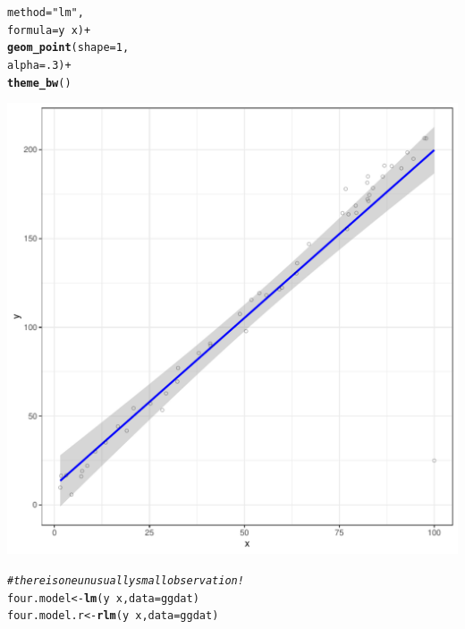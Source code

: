 \documentclass{article}\usepackage[]{graphicx}\usepackage[]{color}
\makeatletter
\def\maxwidth{ %
  \ifdim\Gin@nat@width>\linewidth
    \linewidth
  \else
    \Gin@nat@width
  \fi
}
\newcommand{\hlnum}[1]{\textcolor[rgb]{0.686,0.059,0.569}{#1}}%
\newcommand{\hlstr}[1]{\textcolor[rgb]{0.192,0.494,0.8}{#1}}%
\newcommand{\hlcom}[1]{\textcolor[rgb]{0.678,0.584,0.686}{\textit{#1}}}%
\newcommand{\hlopt}[1]{\textcolor[rgb]{0,0,0}{#1}}%
\newcommand{\hlstd}[1]{\textcolor[rgb]{0.345,0.345,0.345}{#1}}%
\newcommand{\hlkwb}[1]{\textcolor[rgb]{0.69,0.353,0.396}{#1}}%
\newcommand{\hlkwc}[1]{\textcolor[rgb]{0.333,0.667,0.333}{#1}}%
\newcommand{\hlkwd}[1]{\textcolor[rgb]{0.737,0.353,0.396}{\textbf{#1}}}%
\newenvironment{kframe}{%
 \def\at@end@of@kframe{}%
 \ifinner\ifhmode%
  \def\at@end@of@kframe{\end{minipage}}%
  \begin{minipage}{\columnwidth}%
 \fi\fi%
 \def\FrameCommand##1{\hskip\@totalleftmargin \hskip-\fboxsep
 \colorbox{shadecolor}{##1}\hskip-\fboxsep
     \hskip-\linewidth \hskip-\@totalleftmargin \hskip\columnwidth}%
 \MakeFramed {\advance\hsize-\width
   \@totalleftmargin\z@ \linewidth\hsize
   \@setminipage}}%
 {\par\unskip\endMakeFramed%
 \at@end@of@kframe}
\newenvironment{knitrout}{}{} %
\makeatother
\begin{document}
\begin{enumerate}
\begin{enumerate}
\begin{enumerate}
\begin{knitrout}
\begin{kframe}
\begin{alltt}
          \hlkwc{method}\hlstd{=}\hlstr{"lm"}\hlstd{,}
          \hlkwc{formula}\hlstd{=y}\hlopt{~}\hlstd{x)}\hlopt{+}
  \hlkwd{geom_point}\hlstd{(}\hlkwc{shape}\hlstd{=}\hlnum{1}\hlstd{,}
         \hlkwc{alpha}\hlstd{=}\hlnum{.3}\hlstd{)}\hlopt{+}
  \hlkwd{theme_bw}\hlstd{()}
\end{alltt}
\end{kframe}
\includegraphics[width=\maxwidth]{figure/unnamed-chunk-28-1} 
\begin{kframe}\begin{alltt}
\hlcom{#there is one unusually small observation!}
\hlstd{four.model}\hlkwb{<-}\hlkwd{lm}\hlstd{(y}\hlopt{~}\hlstd{x,} \hlkwc{data}\hlstd{=ggdat)}
\hlstd{four.model.r} \hlkwb{<-} \hlkwd{rlm}\hlstd{(y}\hlopt{~}\hlstd{x,} \hlkwc{data}\hlstd{=ggdat)}
\end{alltt}



\end{kframe}
\end{knitrout}
\end{enumerate}
\end{enumerate}
\end{enumerate}
\end{document}
